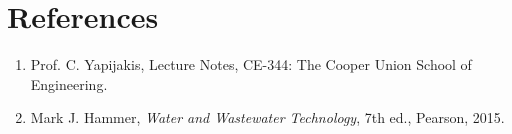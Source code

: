 \documentclass{article}
\begin{document}
    \section{References}
    \begin{enumerate}
        \item Prof. C. Yapijakis, Lecture Notes, CE-344: The Cooper Union School of Engineering.
        \item Mark J. Hammer, \emph{Water and Wastewater Technology}, 7th ed., Pearson, 2015.
    \end{enumerate}
    \newpage    
\end{document}

